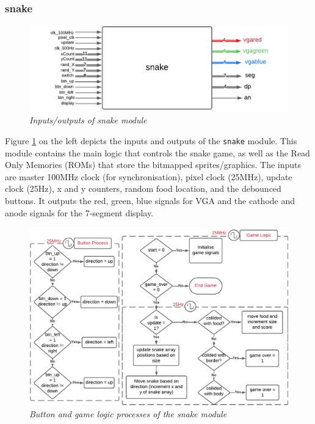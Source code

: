\documentclass[aps, secnumarabic, balancelastpage, asmath, amssymb, nofootinbib, floatfix,]{revtex4-2}
\begin{document}
{\subsubsection{\fontsize{10pt}{12pt}\selectfont \bf snake \label{sec:2.2.1}}

\vspace{-1.5em}
\begin{figure}
    \centering
    \includegraphics[scale = 0.8]{VGA-Flow - Page 1-1.pdf}
    \caption{\em Inputs/outputs of snake module}
    \label{fig:2}
\end{figure}

Figure \ref{fig:2} on the left depicts the inputs and outputs of the \verb|snake| module. This module contains the main logic that controls the snake game, as well as the Read Only Memories (ROMs) that store the bitmapped sprites/graphics. The inputs are master 100MHz clock (for synchronisation), pixel clock (25MHz), update clock (25Hz), x and y counters, random food location, and the debounced buttons. It outputs the red, green, blue signals for VGA and the cathode and anode signals for the 7-segment display. 


\begin{figure}[h]
  \centering
  \includegraphics[scale = 0.72]{logic.pdf}
  \caption{\em Button and game logic processes of the snake module}
  \label{fig:3}
\end{figure}

}
\end{document}
